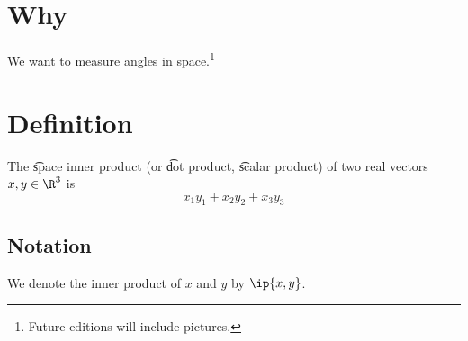 
\section*{Why}

We want to measure angles in space.\footnote{Future editions will include pictures.}

\section*{Definition}

The \t{space inner product} (or \t{dot product}, \t{scalar product}) of two real vectors $x, y \in \R ^3$ is
\[
x_1y_1 + x_2y_2 + x_3y_3
\]

\subsection*{Notation}

We denote the inner product of $x$ and $y$ by $\ip{x,y}$.

\blankpage